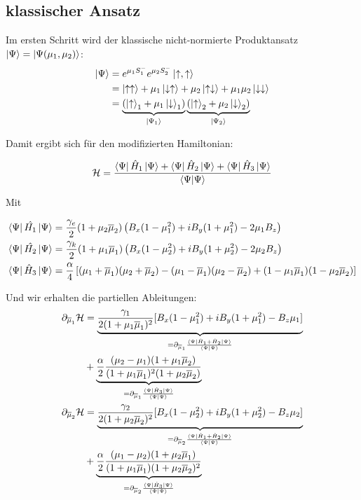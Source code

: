 \documentclass[12pt]{article}
\def\N{\bra{\Psi}\ket{\Psi}}
\def\muk{\overline{\mu}}
\begin{document}
\subsection{klassischer Ansatz}
\noindent Im ersten Schritt wird der klassische nicht-normierte Produktansatz $\ket{\Psi} = \ket{\Psi(\mu_1, \mu_2)}$: 
\begin{align}
    \ket{\Psi} &= e^{\mu_1 S_{1}^{-}}e^{\mu_2 S_{2}^{-}}\ket{\uparrow,\uparrow}\\
                &= \ket{\uparrow \uparrow} +\mu_1\ket{\downarrow \uparrow} + \mu_2\ket{\uparrow \downarrow} + \mu_1\mu_2\ket{\downarrow\downarrow}\\
                &= \underbrace{\left(\ket{\uparrow}_1 + \mu_1\ket{\downarrow}_1\right)}_{\ket{\Psi_1}}\underbrace{\left(\ket{\uparrow}_2 + \mu_2\ket{\downarrow}_2\right)}_{\ket{\Psi_2}}  \\
\end{align}





Damit ergibt sich für den modifizierten Hamiltonian: 

\begin{align}
    \mathcal{H} &= \frac{\bra{\Psi}\hat{H}_1\ket{\Psi}+ \bra{\Psi}\hat{H}_2\ket{\Psi} +\bra{\Psi}\hat{H}_3\ket{\Psi}}{\N}\\
\end{align}

Mit

\begin{align}
   \bra{\Psi}\hat{H_1}\ket{\Psi} &= \frac{\gamma_e}{2}(1+\mu_2\muk_2)\left(B_x(1-\mu_1^2) + iB_y(1+\mu_1^2) - 2\mu_1 B_z\right)\\
   \bra{\Psi}\hat{H_2}\ket{\Psi} &= \frac{\gamma_k}{2}(1+\mu_1\muk_1)\left(B_x(1-\mu_2^2) + iB_y(1+\mu_2^2) - 2\mu_2 B_z\right)\\
   \bra{\Psi}\hat{H}_3\ket{\Psi} &= \frac{\alpha}{4}\left[( \mu_1 + \muk_1)( \mu_2 + \muk_2) - (\mu_1-\muk_1)(\mu_2 - \muk_2) + (1-\mu_1\muk_1)(1-\mu_2\muk_2)\right]
\end{align}  


Und wir erhalten die partiellen Ableitungen:
\begin{align}
    \partial_{\muk_1}\mathcal{H} &= \underbrace{\frac{\gamma_1}{2(1+\mu_1\muk_1)^2}[B_x(1-\mu_1^2) + iB_y(1+\mu_1^2) - B_z\mu_1]}_{= \partial_{\muk_1} \frac{\bra{\Psi}\hat{H}_1 + \hat{H}_2\ket{\Psi}}{\N}} \\
    &+ \underbrace{\frac{\alpha}{2}\frac{(\mu_2 -\mu_1)(1+\mu_1\muk_2)}{(1+\mu_1\muk_1)^2(1+\mu_2\muk_2)}}_{= \partial_{\muk_1} \frac{\bra{\Psi}\hat{H}_3\ket{\Psi}}{\N}}\\
    \partial_{\muk_2}\mathcal{H} &= \underbrace{\frac{\gamma_2}{2(1+\mu_2\muk_2)^2}[B_x(1-\mu_2^2) + iB_y(1+\mu_2^2) - B_z\mu_2]}_{= \partial_{\muk_2} \frac{\bra{\Psi}\hat{H}_1 + \hat{H}_2\ket{\Psi}}{\N}} \\
    &+ \underbrace{\frac{\alpha}{2}\frac{(\mu_1 -\mu_2)(1+\mu_2\muk_1)}{(1+\mu_1\muk_1)(1+\mu_2\muk_2)^2}}_{= \partial_{\muk_2} \frac{\bra{\Psi}\hat{H}_3\ket{\Psi}}{\N}}
\end{align}
\end{document}

